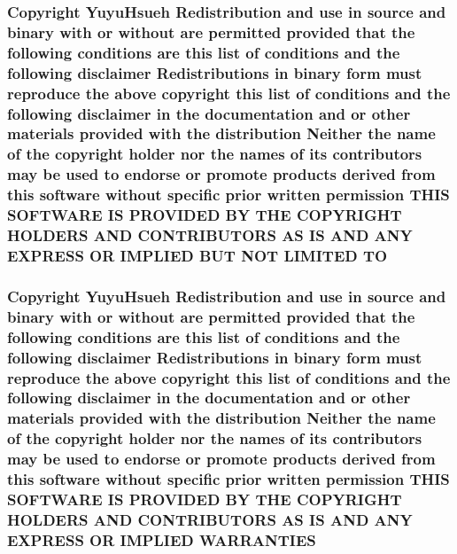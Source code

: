 \subsubsection[{\texorpdfstring{TO}{TO}}]{\setlength{\rightskip}{0pt plus 5cm}Copyright Yuyu\+Hsueh Redistribution and use in source and binary with or without are permitted provided that the following conditions are this list of conditions and the following disclaimer Redistributions in binary form must reproduce the above copyright this list of conditions and the following disclaimer in the documentation and or other materials provided with the distribution Neither the name of the copyright holder nor the names of its contributors may be used to endorse or promote products derived from this software without specific prior written permission T\+H\+IS S\+O\+F\+T\+W\+A\+RE IS P\+R\+O\+V\+I\+D\+ED BY T\+HE C\+O\+P\+Y\+R\+I\+G\+HT H\+O\+L\+D\+E\+RS A\+ND C\+O\+N\+T\+R\+I\+B\+U\+T\+O\+RS AS IS A\+ND A\+NY E\+X\+P\+R\+E\+SS OR I\+M\+P\+L\+I\+ED B\+UT N\+OT L\+I\+M\+I\+T\+ED TO}\hypertarget{license_8txt_a4bddb9a7dc45727be85d1869ee6c870d}{}\label{license_8txt_a4bddb9a7dc45727be85d1869ee6c870d}
\subsubsection[{\texorpdfstring{W\+A\+R\+R\+A\+N\+T\+I\+ES}{WARRANTIES}}]{\setlength{\rightskip}{0pt plus 5cm}Copyright Yuyu\+Hsueh Redistribution and use in source and binary with or without are permitted provided that the following conditions are this list of conditions and the following disclaimer Redistributions in binary form must reproduce the above copyright this list of conditions and the following disclaimer in the documentation and or other materials provided with the distribution Neither the name of the copyright holder nor the names of its contributors may be used to endorse or promote products derived from this software without specific prior written permission T\+H\+IS S\+O\+F\+T\+W\+A\+RE IS P\+R\+O\+V\+I\+D\+ED BY T\+HE C\+O\+P\+Y\+R\+I\+G\+HT H\+O\+L\+D\+E\+RS A\+ND C\+O\+N\+T\+R\+I\+B\+U\+T\+O\+RS AS IS A\+ND A\+NY E\+X\+P\+R\+E\+SS OR I\+M\+P\+L\+I\+ED W\+A\+R\+R\+A\+N\+T\+I\+ES}\hypertarget{license_8txt_a042eb66328050ad88743187ae8e43b95}{}\label{license_8txt_a042eb66328050ad88743187ae8e43b95}
